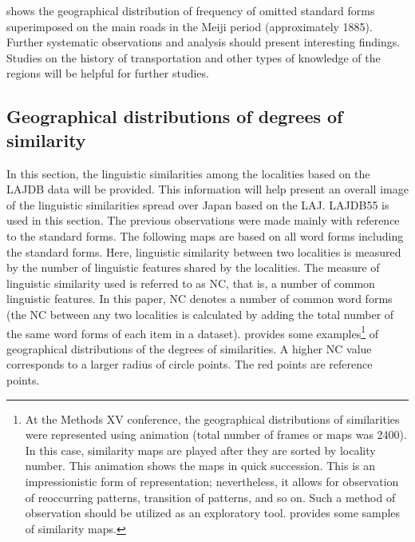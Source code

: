 \documentclass[output=paper]{LSP/langsci}
\begin{document}
 shows the geographical distribution of frequency of omitted standard forms superimposed on the main roads in the Meiji period (approximately 1885). Further systematic observations and analysis should present interesting findings. Studies on the history of transportation and other types of knowledge of the regions will be helpful for further studies.

\subsection{ Geographical distributions of degrees of similarity}
In this section, the linguistic similarities among the localities based on the LAJDB data will be provided. This information will help present an overall image of the linguistic similarities spread over Japan based on the LAJ. LAJDB55 is used in this section. The previous observations were made mainly with reference to the standard forms. The following maps are based on all word forms including the standard forms. Here, linguistic similarity between two localities is measured by the number of linguistic features shared by the localities. The measure of linguistic similarity used is referred to as NC, that is, a number of common linguistic features. In this paper, NC denotes a number of common word forms (the NC between any two localities is calculated by adding the total number of the same word forms of each item in a dataset).  provides some examples\footnote{At the Methods XV conference, the geographical distributions of similarities were represented using animation (total number of frames or maps was 2400). In this case, similarity maps are played after they are sorted by locality number. This animation shows the maps in quick succession. This is an impressionistic form of representation; nevertheless, it allows for observation of reoccurring patterns, transition of patterns, and so on. Such a method of observation should be utilized as an exploratory tool.  provides some samples of similarity maps.} of geographical distributions of the degrees of similarities. A higher NC value corresponds to a larger radius of circle points. The red points are reference points.
\end{document}
